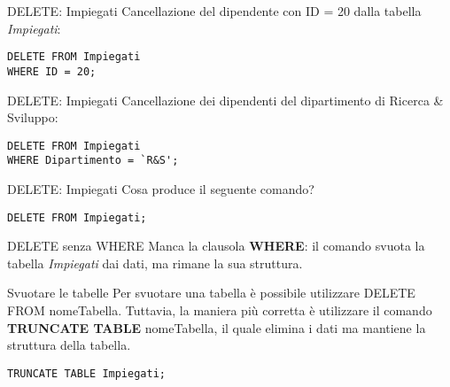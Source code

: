 %
\begin{frame}[fragile]{DELETE: Impiegati}
Cancellazione del dipendente con ID = 20 dalla tabella \textit{Impiegati}:
\pause
\begin{lstlisting}
DELETE FROM Impiegati
WHERE ID = 20;
\end{lstlisting}
\end{frame}
%
\begin{frame}[fragile]{DELETE: Impiegati}
Cancellazione dei dipendenti del dipartimento di Ricerca \& Sviluppo:
\pause
\begin{lstlisting}
DELETE FROM Impiegati
WHERE Dipartimento = `R&S';
\end{lstlisting}
\end{frame}
%
\begin{frame}[fragile]{DELETE: Impiegati}
Cosa produce il seguente comando?
\begin{lstlisting}
DELETE FROM Impiegati;
\end{lstlisting}
\pause
\begin{alertblock}{DELETE senza WHERE}
Manca la clausola \textbf{WHERE}: il comando svuota la tabella \textit{Impiegati} dai dati, ma rimane la sua struttura.
\end{alertblock}
\pause
{\begin{block}{Svuotare le tabelle}
Per svuotare una tabella \`e possibile utilizzare DELETE FROM nomeTabella. Tuttavia, la maniera pi\`u corretta \`e utilizzare il comando \textbf{TRUNCATE TABLE} nomeTabella, il quale elimina i dati ma mantiene la struttura della tabella.
\end{block}
\begin{lstlisting}
TRUNCATE TABLE Impiegati;
\end{lstlisting}
}
\end{frame}
%